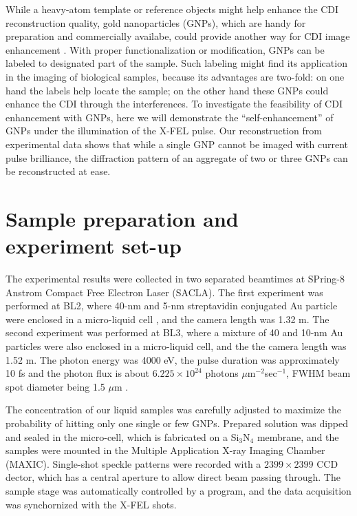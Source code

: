 \documentclass[10pt,letterpaper]{article}
\begin{document}
While a heavy-atom template or reference objects might help enhance the CDI reconstruction quality, gold nanoparticles (GNPs), which are handy for preparation and commercially availabe, could provide another way for CDI image enhancement \cite{shintake}.
With proper functionalization or modification, GNPs can be labeled to designated part of the sample.
Such labeling might find its application in the imaging of biological samples, because its advantages are two-fold: on one hand the labels help locate the sample; on the other hand these GNPs could enhance the CDI through the interferences.
To investigate the feasibility of CDI enhancement with GNPs, here we will demonstrate the ``self-enhancement'' of GNPs under the illumination of the X-FEL pulse. Our reconstruction from experimental data shows that while a single GNP cannot be imaged with current pulse brilliance, the diffraction pattern of an aggregate of two or three GNPs can be reconstructed at ease.


\section{Sample preparation and experiment set-up}

The experimental results were collected in two separated beamtimes at SPring-8 Anstrom Compact Free Electron Laser (SACLA). 
The first experiment was performed at BL2, where 40-nm and 5-nm streptavidin conjugated Au particle were enclosed in a micro-liquid cell \cite{micro-liquid}, and the camera length was 1.32 m. 
The second experiment was performed at BL3, where a mixture of 40 and 10-nm Au particles were also enclosed in a micro-liquid cell, and the the camera length was 1.52 m. 
The photon energy was 4000 eV, the pulse duration was approximately 10 fs and the photon flux is about $6.225\times 10^{24}$ photons $\mu$m$^{-2}$sec$^{-1}$, FWHM beam spot diameter being 1.5 $\mu$m \cite{xfel-ssr}.

The concentration of our liquid samples was carefully adjusted to maximize the probability of hitting only one single or few GNPs. 
Prepared solution was dipped and sealed in the micro-cell, which is fabricated on a Si$_3$N$_4$ membrane, and the samples were mounted in the Multiple Application X-ray Imaging Chamber (MAXIC). 
Single-shot speckle patterns were recorded with a $2399\times2399$ CCD dector, which has a central aperture to allow direct beam passing through. 
The sample stage was automatically controlled by a program, and the data acquisition was synchornized with the X-FEL shots.
\end{document}
